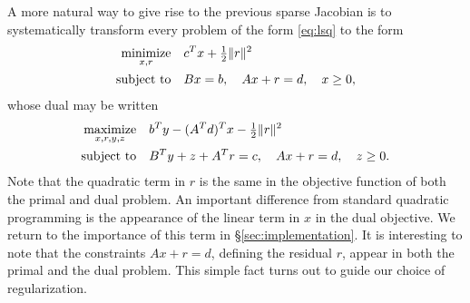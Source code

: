 \documentclass{amsart}
\begin{document}
A more natural way to give rise to the previous sparse Jacobian is to
systematically transform every problem of the form \eqref{eq:lsq} to the form
\begin{equation}
  \label{eq:lsq-r}
  \begin{aligned}
    \displaystyle\mathop{\textup{minimize}}_{x, r} \quad & c^T x + \tfrac{1}{2} \|r\|^2 \\
    \mathop{\textup{subject to}} \quad & Bx = b, \quad Ax + r = d, \quad x \geq 0,
  \end{aligned}
\end{equation}
whose dual may be written
\begin{equation}
  \label{eq:lsq-r-dual}
  \begin{aligned}
    \displaystyle\mathop{\textup{maximize}}_{x, r, y, z} \quad & b^T y - (A^T d)^T x - \tfrac{1}{2} \|r\|^2 \\
    \mathop{\textup{subject to}} \quad & B^T y + z + A^T r = c, \quad
                Ax + r = d, \quad z \geq 0.
  \end{aligned}
\end{equation}
Note that the quadratic term in $r$ is the same in the objective function of
both the primal and dual problem. An important difference from standard
quadratic programming is the appearance of the linear term in $x$ in the
dual objective. We return to the importance of this term in
\S\ref{sec:implementation}.
It is interesting to note that the constraints $Ax + r = d$, defining the
residual $r$, appear in both the primal and the dual problem. This simple fact
turns out to guide our choice of regularization.
\end{document}
